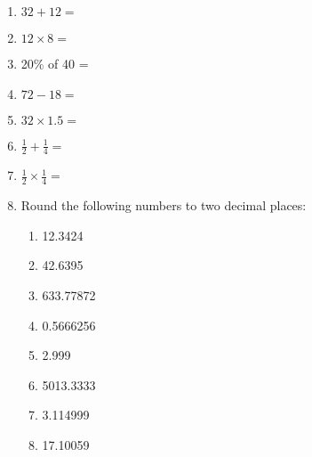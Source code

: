 \documentclass{article}
\begin{document}
\begin{enumerate}
\item \begin{math}  32 + 12 = \end{math} 
\item \begin{math}  12 \times 8 = \end{math} 
\item   20\%  of 40 = 
\item \begin{math}  72 - 18 = \end{math} 
\item \begin{math}  32 \times 1.5 = \end{math} 
\item \begin{math}  \frac{1}{2} + \frac{1}{4} = \end{math}
\item \begin{math}  \frac{1}{2} \times \frac{1}{4} = \end{math}
\item Round the following numbers to two decimal places: 
  \begin{enumerate}\addtolength{\itemsep}{1\baselineskip}
    \item 12.3424 
    \item 42.6395 
    \item 633.77872 
    \item 0.5666256 
    \item 2.999 
    \item 5013.3333 
    \item 3.114999 
    \item 17.10059 
  \end{enumerate} 




\end{enumerate}
\newpage
\end{document}
